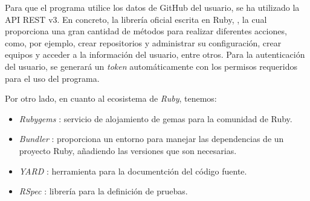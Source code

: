 Para que el programa utilice los datos de GitHub del usuario, se ha utilizado la API REST v3. En concreto,
la librería oficial escrita en Ruby, \cite{B4}, la cual proporciona una gran cantidad de métodos para realizar diferentes acciones, como, por ejemplo,
crear repositorios y administrar su configuración, crear equipos y acceder a la información del usuario, entre otros.
Para la autenticación del usuario, se generará un {\it token} automáticamente con los permisos requeridos para el uso del programa.

Por otro lado, en cuanto al ecosistema de {\it Ruby}, tenemos:
\begin{itemize}
  \item {\it Rubygems} \cite{B5}: servicio de alojamiento de gemas para la comunidad de Ruby.
  \item {\it Bundler} \cite{B6}: proporciona un entorno para manejar las dependencias de un proyecto Ruby, añadiendo las versiones que son necesarias.
  \item {\it YARD} \cite{B7}: herramienta para la documentción del código fuente.
  \item {\it RSpec} \cite{B8}: librería para la definición de pruebas.
\end{itemize}
